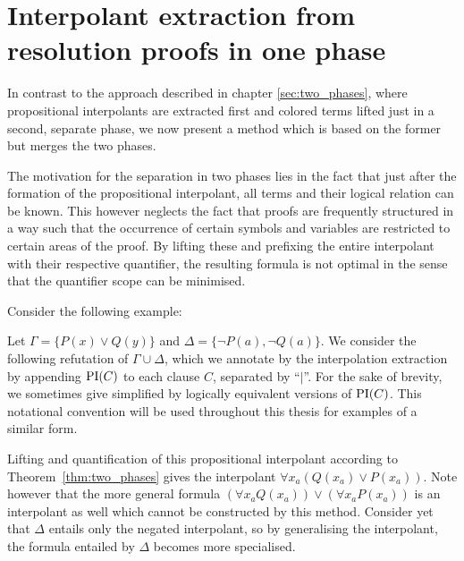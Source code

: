 \chapter{Interpolant extraction from resolution proofs in one phase}
\label{sec:one_phase}

In contrast to the approach described in chapter \ref{sec:two_phases}, where propositional interpolants are extracted first and colored terms lifted just in a second, separate phase, 
we now present a method which is based on the former but merges the two phases.

The motivation for the separation in two phases lies in the fact that just after the formation of the propositional interpolant, all terms and their logical relation can be known.
This however neglects the fact that proofs are frequently structured in a way such that the occurrence of certain symbols and variables are restricted to certain areas of the proof.
By lifting these and prefixing the entire interpolant with their respective quantifier, the resulting formula is not optimal in the sense that the quantifier scope can be minimised.

Consider the following example:

\begin{exa}
	\label{exa:one_phase_motivation}
	Let $\Gamma = \{ P(x) \lor Q(y) \}$ and $\Delta = \{\lnot P(a), \lnot Q(a)\}$.
	We consider the following refutation of $\Gamma \cup \Delta$, which we annotate by the interpolation extraction by appending $\PI(C)$ to each clause $C$, separated by ``$|$''.
	For the sake of brevity, we sometimes give simplified by logically equivalent versions of $\PI(C)$.
	This notational convention will be used throughout this thesis for examples of a similar form.

	\begin{prooftree}
	\end{prooftree}

	Lifting and quantification of this propositional interpolant according to Theorem~\ref{thm:two_phases} gives the interpolant $\forall x_a (Q(x_a) \lor P(x_a))$.
	Note however that the more general formula $(\forall x_a Q(x_a) ) \lor (\forall x_a P(x_a))$ is an interpolant as well which cannot be constructed by this method.
	Consider yet that $\Delta$ entails only the negated interpolant, so by generalising the interpolant, the formula entailed by $\Delta$ becomes more specialised.
\end{exa}


